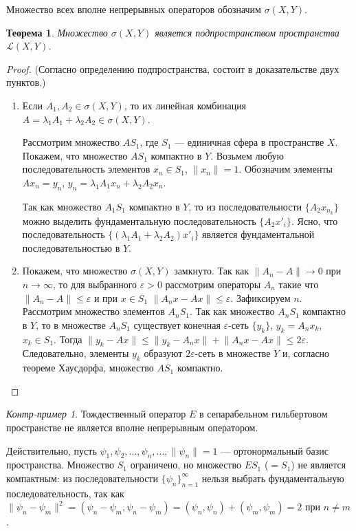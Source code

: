 \documentclass[12pt,a4paper,titlepage,oneside]{book}
\theoremstyle{definition}
\theoremstyle{plain}
\newtheorem*{theorem}{Теорема}
\theoremstyle{break}
\theoremstyle{remark}
\theoremstyle{remark}
\theoremstyle{remark}
\theoremstyle{remark}
\newtheorem*{cexample}{Контр-пример}
\theoremstyle{plain}
\theoremstyle{plain}
\begin{document}
Множество всех вполне непрерывных операторов обозначим $\sigma(X,Y)$.
\begin{theorem}Множество $\sigma(X,Y)$ является подпространством пространства $\mathcal{L}(X, Y)$.
\end{theorem}
\begin{proof}
(Согласно определению подпространства, состоит в доказательстве двух пунктов.)

\begin{enumerate}

	\item Если $A_1, A_2 \in \sigma(X,Y)$, то их линейная комбинация $A=\lambda_1 A_1+\lambda_2 A_2\in \sigma(X,Y)$.

Рассмотрим множество $AS_1$, где $S_1$ --- единичная сфера в пространстве $X$. Покажем, что множество $AS_1$ компактно в $Y$. Возьмем любую последовательность элементов $x_n \in S_1$, $\lVert x_n \rVert=1$. Обозначим элементы $Ax_n=y_n$, $y_n=\lambda_1 A_1 x_n+\lambda_2 A_2 x_n$.

Так как множество $A_1S_1$ компактно в $Y$, то из последовательности $\lbrace A_2x_{n_k} \rbrace$ можно выделить фундаментальную последовательность $\lbrace A_2x'_i \rbrace$. Ясно, что последовательность $\lbrace (\lambda_1 A_1+\lambda_2 A_2)x'_i \rbrace$ является фундаментальной последовательностью в $Y$.

	\item Покажем, что множество $\sigma(X,Y)$ замкнуто. Так как $\lVert A_n-A \rVert \to 0$ при $n\to \infty$, то для выбранного $\varepsilon > 0$ рассмотрим операторы $A_n$ такие что $\lVert A_n-A \rVert \leqslant  \varepsilon$ и при $x \in S_1$ $\lVert A_n x-Ax\rVert \leqslant  \varepsilon$. Зафиксируем $n$. Рассмотрим множество элементов $A_n S_1$. Так как множество $A_n S_1$ компактно в $Y$, то в множестве $A_n S_1$ существует конечная $\varepsilon$-сеть $\lbrace y_k \rbrace$, $y_k=A_n x_k$, $x_k \in S_1$. Тогда $\lVert y_k - Ax\rVert \leqslant \lVert y_k - A_n x\rVert + \lVert A_n x - Ax\rVert \leqslant 2\varepsilon$. Следовательно, элементы $y_k$ образуют $2\varepsilon$-сеть в множестве $Y$ и, согласно теореме Хаусдорфа, множество $AS_1$ компактно.
\qedhere
\end{enumerate}
\end{proof}

\begin{cexample}Тождественный оператор $E$ в сепарабельном гильбертовом пространстве не является вполне непрерывным оператором.

Действительно, пусть $\psi_1,\psi_2,\ldots,\psi_n,\ldots, \lVert\psi_n\rVert =1$ --- ортонормальный базис пространства. Множество $S_1$ ограничено, но множество $ES_1$ ($=S_1$) не является компактным: из последовательности $\lbrace \psi_n \rbrace_{n=1}^{\infty}$ нельзя выбрать фундаментальную последовательность, так как $\lVert\psi_n - \psi_m \rVert ^2=(\psi_n - \psi_m, \psi_n - \psi_m)= (\psi_n,\psi_n)+ (\psi_m,\psi_m)=2$ при $n \neq m$.
\end{cexample}
\end{document}
